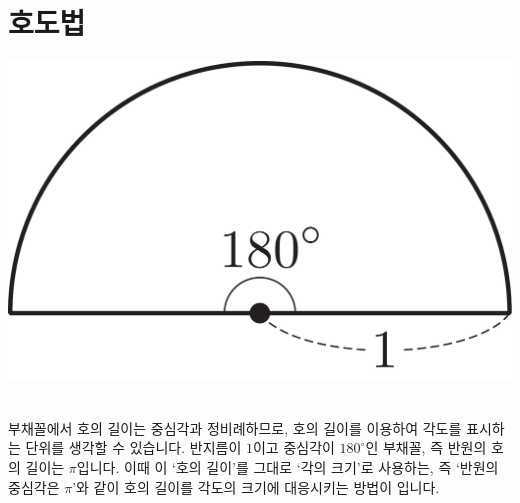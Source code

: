 \section{호도법}
\begin{center} \includegraphics[scale=\pgfkeysvalueof{picsize}]{DBs/pic/zert_06.pdf}\
	\end{center}부채꼴에서 호의 길이는 중심각과 정비례하므로, 호의 길이를 이용하여 각도를 표시하는 단위를 생각할 수 있습니다. 반지름이 $1$이고 중심각이 $180^\circ$인 부채꼴, 즉 반원의 호의 길이는 $\pi$입니다. 이때 이 `호의 길이'를 그대로 `각의 크기'로 사용하는, 즉 `반원의 중심각은 $\pi$'와 같이 호의 길이를 각도의 크기에 대응시키는 방법이 입니다.

